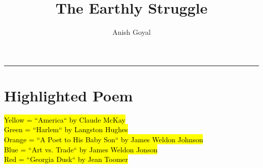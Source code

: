 \documentclass[stu]{apa7}
\title{The Earthly Struggle}
\author{Anish Goyal}
\begin{document}
\maketitle
\tableofcontents
\newpage
\noindent\rule{\textwidth}{1pt}

\section{Highlighted Poem}
\hl{Yellow = ``America`` by Claude McKay}\\
\hl{Green = ``Harlem`` by Langston Hughes}\\
\hl{Orange = ``A Poet to His Baby Son`` by James Weldon Johnson}\\
\hl{Blue = ``Art vs. Trade`` by James Weldon Jonson}\\
\hl{Red = ``Georgia Dusk`` by Jean Toomer}\\
\vspace{5mm}
\end{document}
